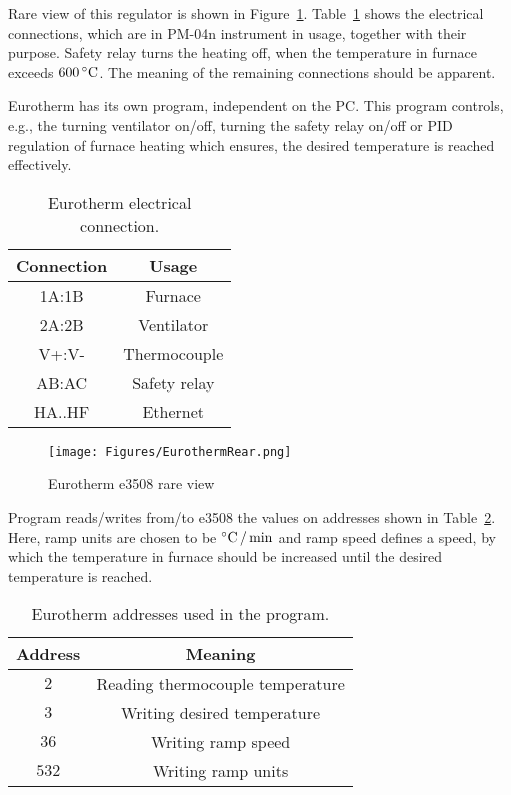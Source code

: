 \documentclass[a4paper,11pt,oneside]{report}
\theoremstyle{named}
\begin{document}
Rare view of this regulator is shown in Figure~\ref{fig:e3508Rare}.
Table~\ref{tab:EurothermConnections} shows the electrical connections, which are
in PM-04n instrument in usage, together with their purpose. Safety relay turns
the heating off, when the temperature in furnace exceeds $600\,^{\circ}{\rm C}$.
The meaning of the remaining connections should be apparent. 

Eurotherm has its own program, independent on the PC. This program
controls, e.g., the turning ventilator on/off, turning the safety relay on/off or PID
regulation of furnace heating which ensures, the desired temperature is reached
effectively.

\begin{table}
  \centering
  \begin{tabular}{c|c}
    \hline
    Connection  & Usage \\
    \hline
    1A:1B        & Furnace \\
    2A:2B        & Ventilator \\
    V+:V-        & Thermocouple \\
    AB:AC        & Safety relay \\
    HA..HF       & Ethernet \\
    \hline
  \end{tabular}
  \caption{Eurotherm electrical connection.}
  \label{tab:EurothermConnections}
\end{table}

\begin{figure}[t]
  \centering
  \texttt{[image: Figures/EurothermRear.png]}
  \caption{Eurotherm e3508 rare view}
  \label{fig:e3508Rare}
\end{figure}

Program reads/writes from/to e3508 the values on addresses shown in
Table~\ref{tab:EurothermAddresses}. Here, ramp units are chosen to be
$^{\circ}{\rm C}\,/\,{\rm min}$ and ramp speed defines a speed, by which
the temperature in furnace should be increased until the desired temperature is
reached. 

\begin{table}
  \centering
  \begin{tabular}{c|c}
    \hline
    Address  & Meaning \\
    \hline
    $2$      & Reading thermocouple temperature \\
    $3$      & Writing desired temperature  \\
    $36$     & Writing ramp speed \\
    $532$    & Writing ramp units \\
    \hline
  \end{tabular}
  \caption{Eurotherm addresses used in the program.}
  \label{tab:EurothermAddresses}
\end{table}
\end{document}
